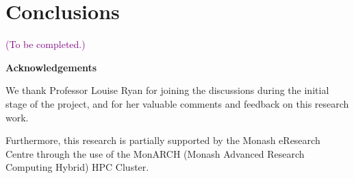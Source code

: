 \documentclass[11pt,a4paper,]{article}
\begin{document}
\hypertarget{sec-conclusion}{%
\section{Conclusions}\label{sec-conclusion}}

\textcolor{purple}{(To be completed.)} \newline

\textbf{\large{Acknowledgements}}

We thank Professor Louise Ryan for joining the discussions during the
initial stage of the project, and for her valuable comments and feedback
on this research work.

Furthermore, this research is partially supported by the Monash
eResearch Centre through the use of the MonARCH (Monash Advanced
Research Computing Hybrid) HPC Cluster.

\printbibliography
\end{document}
